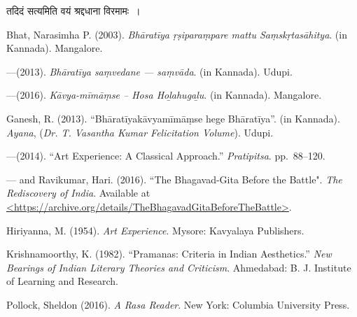 {\dev तदिदं सत्यमिति वयं श्रद्दधाना विरमामः~।}

\begin{thebibliography}{99}
\itemsep=-1pt
Bhat, Narasimha P. (2003). \textsl{Bhāratīya ṛṣiparaṃpare mattu Saṃskṛtasāhitya}. (in Kannada). Mangalore. 

---\kern3pt(2013). \textsl{Bhāratīya saṃvedane --- saṃvāda}. (in Kannada). Udupi.

---\kern3pt(2016). \textsl{Kāvya-mīmāṃse -- Hosa Hoḻahugaḻu}. (in Kannada). Mangalore.

Ganesh, R. (2013). ``Bhāratīyakāvyamīmāṃse hege Bhāratīya''. (in Kannada). \textsl{Ayana}, (\textsl{Dr. T. Vasantha Kumar Felicitation Volume}). Udupi.

---\kern3pt(2014). ``Art Experience: A Classical Approach.'' \textsl{Pratipitsa}. pp.~88--120.

---\kern3pt and Ravikumar, Hari. (2016). ``The Bhagavad-Gita Before the Battle". \textsl{The Rediscovery of India}. Available at \url{<https://archive.org/details/TheBhagavadGitaBeforeTheBattle>}.

Hiriyanna, M. (1954). \textsl{Art Experience}. Mysore: Kavyalaya Publishers.

Krishnamoorthy, K. (1982). ``Pramanas: Criteria in Indian Aesthetics.'' \textsl{New Bearings of Indian Literary Theories and Criticism}. Ahmedabad: B. J. Institute of Learning and Research.

Pollock, Sheldon (2016). \textsl{A Rasa Reader}. New York: Columbia University Press.
\end{thebibliography}

\theendnotes
\label{chapter\thechapter:end}

